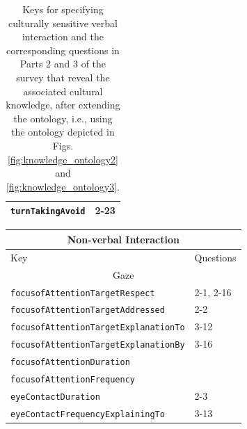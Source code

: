 \documentclass{CSSRforAfrica}
\begin{document}
\begin{table}[H]
\begin{center}
\begin{tabular}{|l l|}
{\footnotesize \verb+turnTakingAvoid+}            & {\footnotesize 2-23 } \\
\hline \hline
\end{tabular}
\end{center}
\caption{Keys for specifying culturally sensitive verbal interaction and the corresponding questions in Parts 2 and 3 of the survey that reveal the associated cultural knowledge, after extending the ontology, i.e., using the ontology depicted in Figs. \ref{fig:knowledge_ontology2} and \ref{fig:knowledge_ontology3}.}
\label{table:key-value_questions_verbal}
\end{table}


\begin{table}[H]
\vspace{-10mm}
\begin{center}
\begin{tabular}{|l l|}
\hline \hline
\multicolumn{2}{|c|}{{\small \bf Non-verbal Interaction}} \\
\hline \hline
 {\small Key  }                                         &  {\small Questions }      \\
\hline
\multicolumn{2}{|c|}{{\footnotesize Gaze}} \\
\hline
{\footnotesize \verb+focusofAttentionTargetRespect+} 	    & {\footnotesize 2-1, 2-16} \vspace{-1.01mm}\\
{\footnotesize \verb+focusofAttentionTargetAddressed+} 	    & {\footnotesize 2-2} \vspace{-1.01mm}\\
{\footnotesize \verb+focusofAttentionTargetExplanationTo+} 	    & {\footnotesize 3-12} \vspace{-1.01mm}\\
{\footnotesize \verb+focusofAttentionTargetExplanationBy+} 	    & {\footnotesize 3-16} \vspace{-1.01mm}\\
{\footnotesize \verb+focusofAttentionDuration+}     & {\footnotesize \verb++} \vspace{-1.01mm}\\
{\footnotesize \verb+focusofAttentionFrequency+}   & {\footnotesize \verb++} \vspace{-1.01mm}\\
{\footnotesize \verb+eyeContactDuration+} 	            & {\footnotesize 2-3 } \vspace{-1mm}\\
{\footnotesize \verb+eyeContactFrequencyExplainingTo+} 	                   & {\footnotesize 3-13 } \vspace{-1.01mm}\\

\end{tabular}
\end{center}
\end{table}
\end{document}
